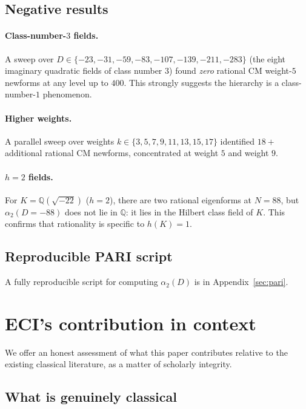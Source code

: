 \documentclass[12pt]{amsart}
\theoremstyle{definition}
\newcommand{\Q}{\mathbb{Q}}
\begin{document}
\subsection{Negative results}

\paragraph{Class-number-$3$ fields.}
A sweep over $D \in \{-23, -31, -59, -83, -107, -139, -211, -283\}$
(the eight imaginary quadratic fields of class number $3$)
found \emph{zero} rational CM weight-$5$ newforms at any level up to $400$.
This strongly suggests the hierarchy is a class-number-$1$ phenomenon.

\paragraph{Higher weights.}
A parallel sweep over weights $k \in \{3, 5, 7, 9, 11, 13, 15, 17\}$
identified $18+$ additional rational CM newforms, concentrated at
weight $5$ and weight $9$.

\paragraph{$h=2$ fields.}
For $K = \Q(\sqrt{-22})$ ($h=2$), there are two rational eigenforms at
$N = 88$, but $\alpha_2(D=-88)$ does not lie in $\Q$: it lies in the
Hilbert class field of $K$.
This confirms that rationality is specific to $h(K) = 1$.

\subsection{Reproducible PARI script}

A fully reproducible script for computing $\alpha_2(D)$ is in
Appendix~\ref{sec:pari}.

\section{ECI's contribution in context}
\label{sec:positioning}

We offer an honest assessment of what this paper contributes relative to the
existing classical literature, as a matter of scholarly integrity.

\subsection{What is genuinely classical}
\end{document}
